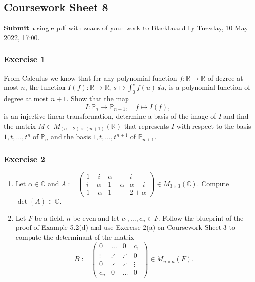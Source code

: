 \documentclass[
  12pt,
  a4paper,
  twoside]{article}
\theoremstyle{plain}
\theoremstyle{definition}
\begin{document}
\hypertarget{coursework-sheet-8}{%
\subsection{Coursework Sheet 8}\label{coursework-sheet-8}}

\textbf{Submit} a single pdf with scans of your work to Blackboard by Tuesday, 10 May 2022, 17:00.

\hypertarget{exercise-1-7}{%
\subsubsection*{Exercise 1}\label{exercise-1-7}}

From Calculus we know that for any polynomial function \(f: \mathbb{R} \rightarrow \mathbb{R}\) of degree at most \(n\), the function \(I(f): \mathbb{R} \rightarrow \mathbb{R}\), \(s \mapsto \int_0^s f(u)\, du\), is a polynomial
function of degree at most \(n+1\). Show that the map
\[I: \mathbb{P}_n \rightarrow \mathbb{P}_{n+1}, \quad f \mapsto I(f),\]
is an injective linear transformation, determine a basis of the
image of \(I\) and find the matrix \(M\in M_{(n+2)\times(n+1)}(\mathbb{R})\)
that represents \(I\) with respect to the basis \(1, t, \ldots, t^n\)
of \(\mathbb{P}_n\) and the basis \(1, t, \ldots, t^{n+1}\) of \(\mathbb{P}_{n+1}\).

\hypertarget{exercise-2-7}{%
\subsubsection*{Exercise 2}\label{exercise-2-7}}

\begin{enumerate}
\def\labelenumi{(\alph{enumi})}
\item
  Let \(\alpha \in \mathbb{C}\) and \(A:= \left(\begin{array}{ccc} 1-i & \alpha & i \\ i-\alpha & 1 - \alpha & \alpha -i \\ 1- \alpha & 1 & 2+ \alpha \end{array}\right) \in M_{3 \times 3}(\mathbb{C})\). Compute
  \(\det(A) \in \mathbb{C}\).
\item
  Let \(F\) be a field, \(n\) be even and let \(c_1, \ldots, c_n \in F\). Follow
  the blueprint of the proof of Example 5.2(d) and use Exercise 2(a) on
  Coursework Sheet 3 to compute the determinant of the matrix
  \[B:= \left(\begin{array}{cccc} 0 &
  \ldots & 0 & c_1 \\ \vdots & \iddots & \iddots & 0 \\ 0 & \iddots
  & \iddots & \vdots \\ c_n & 0 & \ldots & 0 \end{array}\right)
  \in M_{n \times n}(F).\]
\end{enumerate}
\end{document}
